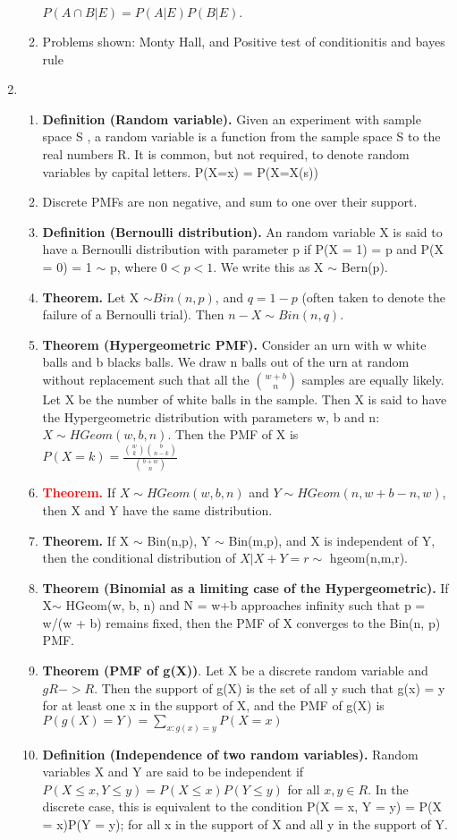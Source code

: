 \documentclass[11pt]{article}
\begin{document}
\begin{enumerate}
\begin{enumerate}
	$P(A \cap B | E) = P(A | E)P(B | E).$
	\item Problems shown: Monty Hall, and Positive test of conditionitis and bayes rule
\end{enumerate}
\item
\begin{enumerate}
	\item \textbf{Definition (Random variable).} Given an experiment with sample space S , a random variable is a function
	from the sample space S to the real numbers R. It is common, but not required, to denote random variables
	by capital letters. P(X=x) = P(X=X(s))
	\item Discrete PMFs are non negative, and sum to one over their support.
	\item \textbf{Definition (Bernoulli distribution). }An random variable X is said to have a Bernoulli distribution with
	parameter p if P(X = 1) = p and P(X = 0) = 1 $\sim$ p, where $0 < p < 1$. We write this as X $\sim$ Bern(p).
	\item \textbf{Theorem. }Let X $\sim Bin(n, p)$, and $q = 1 - p$ (often taken to denote the failure of a Bernoulli trial). Then
	$n - X \sim Bin(n, q)$.
	\item \textbf{Theorem (Hypergeometric PMF).} Consider an urn with w white balls and b blacks balls. We draw n balls
	out of the urn at random without replacement such that all the
	$\binom{w+b}{n}$
	samples are equally likely. Let X be the
	number of white balls in the sample. Then X is said to have the Hypergeometric distribution with parameters
	w, b and n: $X \sim HGeom(w, b, n)$. Then the PMF of X is\\
	$P(X=k)=\frac{\binom{w}{k}\binom{b}{n-k}}{\binom{b+w}{n}}$
	\item \textcolor{red}{\textbf{Theorem.}} If $X \sim HGeom(w, b, n)$ and $Y \sim HGeom(n,w+b-n,w)$, then X and Y have the same distribution.
	\item \textbf{Theorem.} If X $\sim$ Bin(n,p), Y $\sim$ Bin(m,p), and X is independent of Y, then the conditional distribution of
	$X|X+Y=r \sim$ hgeom(n,m,r).
	\item \textbf{Theorem (Binomial as a limiting case of the Hypergeometric).} If X$\sim$ HGeom(w, b, n) and N = w+b approaches infinity
	such that p = w/(w + b) remains fixed, then the PMF of X converges to the Bin(n, p) PMF.
	\item \textbf{ Theorem (PMF of g(X))}. Let X be a discrete random variable and $g R->R$. Then the support of g(X) is
	the set of all y such that g(x) = y for at least one x in the support of X, and the PMF of g(X) is
	$P(g(X) = Y) = \sum_{x:g(x)=y} P(X=x)$
	\item \textbf{Definition (Independence of two random variables).} Random variables X and Y are said to be independent
	if
	$P(X \le x, Y \le y) = P(X \le x)P(Y \le y)$
	for all $x, y \in R$. In the discrete case, this is equivalent to the condition
	P(X = x, Y = y) = P(X = x)P(Y = y);
	for all x in the support of X and all y in the support of Y.
\end{enumerate}

\end{enumerate}
\end{document}
